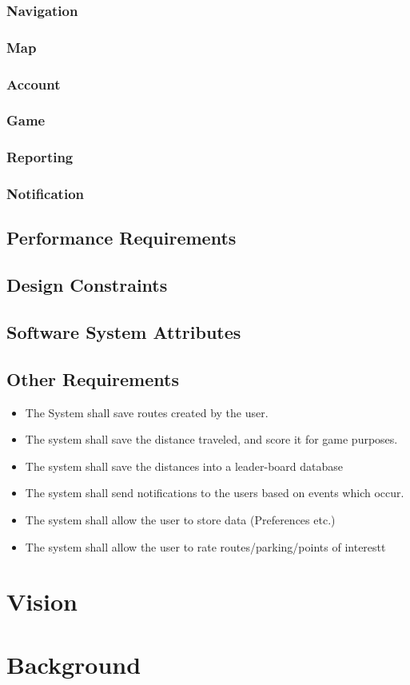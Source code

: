 \documentclass{article}
\begin{document}
    	\subsubsection{Navigation}
    	
    	\subsubsection{Map}
    	
    	\subsubsection{Account}
    	
    	\subsubsection{Game}
    	
    	\subsubsection{Reporting}
    	
    	\subsubsection{Notification}
    	
        	
        \subsection{Performance Requirements}
        \subsection{Design Constraints}
        \subsection{Software System Attributes}
        \subsection{Other Requirements}
	\begin{itemize}
  		\item The System shall save routes created by the user.
		\item The system shall save the distance traveled, and score it for game purposes.
		\item The system shall save the distances into a leader-board database
		\item The system shall send notifications to the users based on events which occur.
		\item The system shall allow the user to store data (Preferences etc.)
		\item The system shall allow the user to rate routes/parking/points of interestt
	\end{itemize}
	\section{Vision}


	\section{Background}
	
\end{document}
